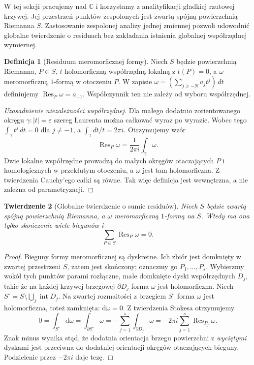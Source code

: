\documentclass[11pt,a4paper,openany]{report}
\numberwithin{equation}{section}
\theoremstyle{plain}
\newtheorem{twierdzenie}{Twierdzenie}[section]
\theoremstyle{definition}
\newtheorem{definicja}[twierdzenie]{Definicja}
\theoremstyle{remark}
\newcommand{\C}{\mathbb C}
\begin{document}
W tej sekcji pracujemy nad $\C$ i korzystamy z
analityfikacji gładkiej rzutowej krzywej. Jej
przestrzeń punktów zespolonych jest zwartą
spójną powierzchnią Riemanna $S$. Zastosowanie
zespolonej analizy jednej zmiennej pozwoli
udowodnić globalne twierdzenie o residuach bez
zakładania istnienia globalnej współrzędnej wymiernej.

\begin{definicja}[Residuum meromorficznej formy]
Niech $S$ będzie powierzchnią Riemanna, $P\in S$,
$t$ holomorficzną współrzędną lokalną z $t(P)=0$,
a $\omega$ meromorficzną $1$-formą w otoczeniu $P$.
W zapisie
$\omega=(\sum_{j\ge-N}a_jt^j)\,dt$
definiujemy $\operatorname{Res}_P\omega=a_{-1}$.
Współczynnik ten nie zależy od wyboru współrzędnej.
\end{definicja}
\begin{proof}[Uzasadnienie niezależności współrzędnej]
Dla małego dodatnio zorientowanego okręgu
$\gamma:|t|=\varepsilon$ szereg Laurenta można
całkować wyraz po wyrazie. Wobec tego
$\int_\gamma t^j\,dt=0$ dla $j\ne-1$,
a $\int_\gamma dt/t=2\pi i$. Otrzymujemy wzór
\[
\operatorname{Res}_P\omega=
 \frac1{2\pi i}\int_\gamma\omega.
\]
Dwie lokalne współrzędne prowadzą do małych
okręgów otaczających $P$ i homologicznych w
przekłutym otoczeniu, a $\omega$ jest tam
holomorficzna. Z twierdzenia Cauchy'ego całki
są równe. Tak więc definicja jest wewnętrzna,
a nie zależna od parametryzacji.
\end{proof}

\begin{twierdzenie}[Globalne twierdzenie o sumie residuów]
\label{tw:residue-general}
Niech $S$ będzie zwartą spójną powierzchnią
Riemanna, a $\omega$ meromorficzną $1$-formą na $S$.
Wtedy ma ona tylko skończenie wiele biegunów i
\[
\sum_{P\in S}\operatorname{Res}_P\omega=0.
\]
\end{twierdzenie}
\begin{proof}
Bieguny formy meromorficznej są dyskretne.
Ich zbiór jest domknięty w zwartej przestrzeni $S$,
zatem jest skończony; oznaczmy go $P_1,\ldots,P_s$.
Wybierzmy wokół tych punktów parami rozłączne,
małe domknięte dyski współrzędnych $D_j$,
takie że na każdej krzywej brzegowej $\partial D_j$
forma $\omega$ jest holomorficzna.
Niech $S^\circ=S\setminus\bigcup_j\operatorname{int}D_j$.
Na zwartej rozmaitości z brzegiem $S^\circ$
forma $\omega$ jest holomorficzna, toteż zamknięta:
$\mathrm d\omega=0$. Z twierdzenia Stokesa
otrzymujemy
\[
0=\int_{S^\circ}\mathrm d\omega
 =\int_{\partial S^\circ}\omega
 =-\sum_{j=1}^s\int_{\partial D_j}\omega
 =-2\pi i\sum_{j=1}^s\operatorname{Res}_{P_j}\omega.
\]
Znak minus wynika stąd, że dodatnia orientacja
brzegu powierzchni z \emph{wyciętymi} dyskami
jest przeciwna do dodatniej orientacji okręgów
otaczających bieguny. Podzielenie przez $-2\pi i$
daje tezę.
\end{proof}
\end{document}
